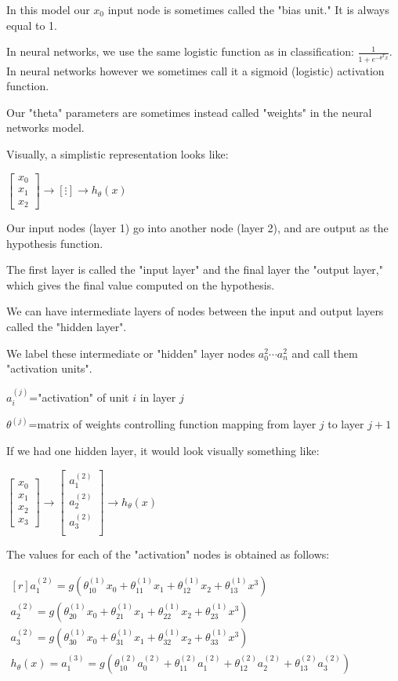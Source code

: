 \documentclass{article}
\begin{document}
In this model our $x_0$ input node is sometimes called the "bias unit." It is always equal to 1.

In neural networks, we use the same logistic function as in classification: $\frac{1}{1+e^{−\theta^Tx}}$. In neural networks however we sometimes call it a sigmoid (logistic) activation function.

Our "theta" parameters are sometimes instead called "weights" in the neural networks model.

Visually, a simplistic representation looks like:

$\begin{bmatrix}
x_0 \\
x_1 \\
x_2
\end{bmatrix}\to\left[\vdots \right]\to h_{\theta}(x)
$

Our input nodes (layer 1) go into another node (layer 2), and are output as the hypothesis function.

The first layer is called the "input layer" and the final layer the "output layer," which gives the final value computed on the hypothesis.

We can have intermediate layers of nodes between the input and output layers called the "hidden layer".

We label these intermediate or "hidden" layer nodes $a_0^2 \cdots a_n^2$ and call them "activation units".

$a_i^{(j)}$="activation" of unit $i$ in layer $j$

$\theta^{(j)}$=matrix of weights controlling function mapping from layer $j$ to layer $j+1$

If we had one hidden layer, it would look visually something like:


$\begin{bmatrix}
x_0 \\
x_1 \\
x_2 \\
x_3
\end{bmatrix}\to
\begin{bmatrix}
a_1^{(2)} \\
a_2^{(2)} \\
a_3^{(2)} \\
\end{bmatrix}
\to h_{\theta}(x)
$


The values for each of the "activation" nodes is obtained as follows:

$
\begin{matrix*}[r]

a_1^{(2)}=g(\theta_{10}^{(1)}x_0+\theta_{11}^{(1)}x_1+\theta_{12}^{(1)}x_2+\theta_{13}^{(1)}x^3) \\
a_2^{(2)}=g(\theta_{20}^{(1)}x_0+\theta_{21}^{(1)}x_1+\theta_{22}^{(1)}x_2+\theta_{23}^{(1)}x^3) \\
a_3^{(2)}=g(\theta_{30}^{(1)}x_0+\theta_{31}^{(1)}x_1+\theta_{32}^{(1)}x_2+\theta_{33}^{(1)}x^3) \\
h_{\theta}(x)=a_1^{(3)}=g(\theta_{10}^{(2)}a_0^{(2)}+\theta_{11}^{(2)}a_1^{(2)}+\theta_{12}^{(2)}a_2^{(2)}+\theta_{13}^{(2)}a_3^{(2)})
\end{matrix*}
$
\end{document}
